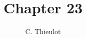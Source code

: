\documentclass[a4paper,12pt]{report}
\title{Chapter 23}
\author{C. Thieulot}
\begin{document}
\maketitle
\tableofcontents

 \label{chapt:viscoelasticity} %

\printbibliography
\end{document}
